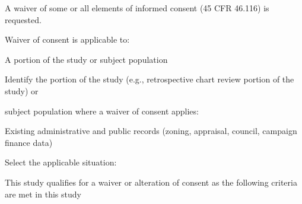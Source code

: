 \documentclass[10pt, letterpaper]{article}
\begin{document}
\noindent \makebox[0pt][l]{\color{columbiablue_official}$\boxtimes$}\hspace{1.2em} A waiver of some or all elements of informed consent (45 CFR 46.116) is requested.

\begin{responsebox}

Waiver of consent is applicable to:

A portion of the study or subject population

\vspace{0.5em}

\vspace{0.5em}

Identify the portion of the study (e.g., retrospective chart review portion of the study) or

subject population where a waiver of consent applies:

Existing administrative and public records (zoning, appraisal, council, campaign finance data)

\vspace{0.5em}

\vspace{0.5em}

Select the applicable situation:

\vspace{0.5em}

\vspace{0.5em}

\end{responsebox}

\noindent \makebox[0pt][l]{\color{columbiablue_official}$\boxtimes$}\hspace{1.2em}This study qualifies for a waiver or alteration of consent as the following criteria are met in this study
\end{document}

